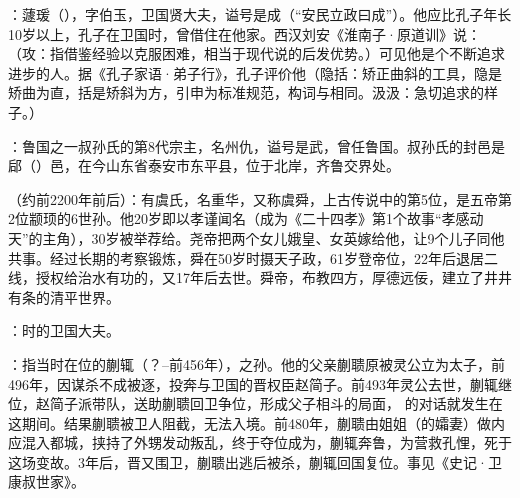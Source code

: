 ：蘧瑗（），字伯玉，卫国贤大夫，谥号是成（“安民立政曰成”）。他应比孔子年长10岁以上，孔子在卫国时，曾借住在他家。西汉刘安《淮南子·原道训》说：（攻：指借鉴经验以克服困难，相当于现代说的后发优势。）可见他是个不断追求进步的人。据《孔子家语·弟子行》，孔子评价他（隐括：矫正曲斜的工具，隐是矫曲为直，括是矫斜为方，引申为标准规范，构词与相同。汲汲：急切追求的样子。）

：鲁国之一叔孙氏的第8代宗主，名州仇，谥号是武，曾任鲁国。叔孙氏的封邑是郈（）邑，在今山东省泰安市东平县，位于北岸，齐鲁交界处。


（约前2200年前后）：有虞氏，名重华，又称虞舜，上古传说中的第5位，是五帝第2位颛顼的6世孙。他20岁即以孝谨闻名（成为《二十四孝》第1个故事“孝感动天”的主角），30岁被举荐给。尧帝把两个女儿娥皇、女英嫁给他，让9个儿子同他共事。经过长期的考察锻炼，舜在50岁时摄天子政，61岁登帝位，22年后退居二线，授权给治水有功的，又17年后去世。舜帝，布教四方，厚德远佞，建立了井井有条的清平世界。

：时的卫国大夫。

：指当时在位的蒯辄（？--前456年），之孙。他的父亲蒯聩原被灵公立为太子，前496年，因谋杀不成被逐，投奔与卫国的晋权臣赵简子。前493年灵公去世，蒯辄继位，赵简子派带队，送助蒯聩回卫争位，形成父子相斗的局面， 的对话就发生在这期间。结果蒯聩被卫人阻截，无法入境。前480年，蒯聩由姐姐（的孀妻）做内应混入都城，挟持了外甥发动叛乱，终于夺位成为，蒯辄奔鲁，为营救孔悝，死于这场变故。3年后，晋又围卫，蒯聩出逃后被杀，蒯辄回国复位。事见《史记·卫康叔世家》。%

